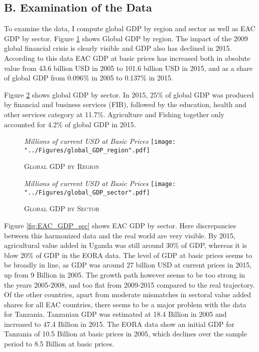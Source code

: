 \documentclass[a4paper]{article}
\begin{document}
\subsection*{B. Examination of the Data}
\setcounter{table}{0}
\renewcommand{\thetable}{B\arabic{table}}
\setcounter{figure}{0}
\renewcommand{\thefigure}{B\arabic{figure}}

To examine the data, I compute global GDP by region and sector as well as EAC GDP by sector. Figure \ref{fig:wld_GDP_reg} shows Global GDP by region. The impact of the 2009 global financial crisis is clearly visible and GDP also has declined in 2015. %
According to this data EAC GDP at basic prices has increased both in absolute value from 43.6 billion USD in 2005 to 101.6 billion USD in 2015, and as a share of global GDP from 0.096\% in 2005 to 0.137\% in 2015. \newline

Figure \ref{fig:wld_GDP_sec} shows global GDP by sector. In 2015, 25\% of global GDP was produced by financial and business services (FIB), followed by the education, health and other services category at 11.7\%. Agriculture and Fishing together only accounted for 4.2\% of global GDP in 2015.




\begin{figure}[h!]
\centering
\caption{\label{fig:wld_GDP_reg}\textsc{Global GDP by Region}}
\small{\textit{Millions of current USD at Basic Prices}}
\texttt{[image: "../Figures/global\_GDP\_region".pdf]} %
\end{figure}
\FloatBarrier

\begin{figure}[h!]
\centering
\caption{\label{fig:wld_GDP_sec}\textsc{Global GDP by Sector}}
\small{\textit{Millions of current USD at Basic Prices}}
\texttt{[image: "../Figures/global\_GDP\_sector".pdf]} %
\end{figure}
\FloatBarrier

Figure \ref{fig:EAC_GDP_sec} shows EAC GDP by sector. Here discrepancies between this harmonized data and the real world are very visible. By 2015, agricultural value added in Uganda was still around 30\% of GDP, whereas it is blow 20\% of GDP in the EORA data. The level of GDP at basic prices seems to be broadly in line, as GDP was around 27 billion USD at current prices in 2015, up from 9 Billion in 2005. The growth path however seems to be too strong in the years 2005-2008, and too flat from 2009-2015 compared to the real trajectory. Of the other countries, apart from moderate mismatches in sectoral value added shares for all EAC countries, there seems to be a major problem with the data for Tanzania. Tanzanian GDP was estimated at 18.4 Billion in 2005 and increased to 47.4 Billion in 2015. The EORA data show an initial GDP for Tanzania of 10.5 Billion at basic prices in 2005, which declines over the sample period to 8.5 Billion at basic prices. \newline
\end{document}
